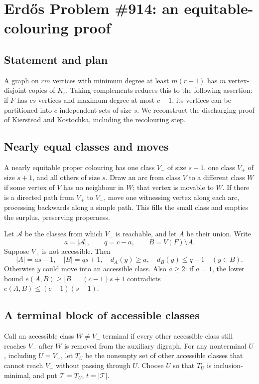 \section*{Erd\H{o}s Problem \#914: an equitable-colouring proof}
\subsection*{Statement and plan}
A graph on \(rm\) vertices with minimum degree at least \(m(r-1)\) has \(m\) vertex-disjoint copies of \(K_r\).
Taking complements reduces this to the following assertion: if \(F\) has \(cs\) vertices and maximum degree at most \(c-1\), its vertices can be partitioned into \(c\) independent sets of size \(s\). We reconstruct the discharging proof of Kierstead and Kostochka, including the recolouring step.

\subsection*{Nearly equal classes and moves}
A nearly equitable proper colouring has one class \(V_-\) of size \(s-1\), one class \(V_+\) of size \(s+1\), and all others of size \(s\). Draw an arc from class \(V\) to a different class \(W\) if some vertex of \(V\) has no neighbour in \(W\); that vertex is movable to \(W\).
If there is a directed path from \(V_+\) to \(V_-\), move one witnessing vertex along each arc, processing backwards along a simple path. This fills the small class and empties the surplus, preserving properness.

Let \(\mathcal A\) be the classes from which \(V_-\) is reachable, and let \(A\) be their union. Write
\[
a=|\mathcal A|,\qquad q=c-a,\qquad B=V(F)\setminus A.
\]
Suppose \(V_+\) is not accessible. Then
\[
|A|=as-1,\quad |B|=qs+1,\quad
d_A(y)\geq a,\quad d_B(y)\leq q-1\quad(y\in B). \tag{1}
\]
Otherwise \(y\) could move into an accessible class.
Also \(a\geq2\): if \(a=1\), the lower bound
\(e(A,B)\geq|B|=(c-1)s+1\) contradicts
\(e(A,B)\leq(c-1)(s-1)\).

\subsection*{A terminal block of accessible classes}
Call an accessible class \(W\ne V_-\) terminal if every other accessible class still reaches \(V_-\) after \(W\) is removed from the auxiliary digraph.
For any nonterminal \(U\), including \(U=V_-\), let \(T_U\) be the nonempty set of other accessible classes that cannot reach \(V_-\) without passing through \(U\).
Choose \(U\) so that \(T_U\) is inclusion-minimal, and put
\(\mathcal T=T_U\), \(t=|\mathcal T|\).

